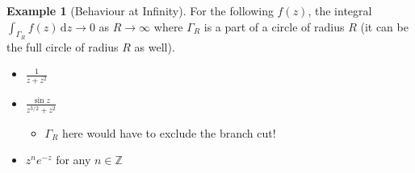 \documentclass[a4paper, 12pt]{article}
\theoremstyle{definition}
\newtheorem{example}{Example}
\numberwithin{theorem}{section}
\numberwithin{definition}{section}
\numberwithin{exercise}{section}
\numberwithin{remark}{section}
\numberwithin{figure}{section}
\numberwithin{example}{section}
\newcommand{\intd}{\,\text{d}}
\begin{document}
\begin{example}[Behaviour at Infinity]
    For the following $f(z)$, the integral $\int_{\Gamma_R} f(z) \intd z \rightarrow 0$ as $R \rightarrow \infty$ where $\Gamma_R$ is a part of a circle of radius $R$ (it can be the full circle of radius $R$ as well).
    \begin{itemize}
        \item $\frac{1}{z+z^2}$
        \item $\frac{\sin{z}}{z^{3/2}+z^2}$
            \begin{itemize}
                \item $\Gamma_R$ here would have to exclude the branch cut!
            \end{itemize}
        \item $z^ne^{-z}$ for any $n \in \mathbb{Z}$
    \end{itemize}
\end{example}
\end{document}
